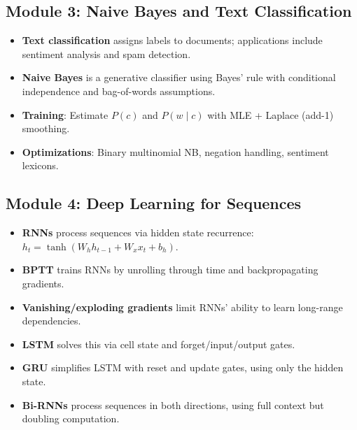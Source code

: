\documentclass[11pt,a4paper]{article}
\begin{document}
\subsection{Module 3: Naive Bayes and Text Classification}
\begin{itemize}
    \item \textbf{Text classification} assigns labels to documents; applications include sentiment analysis and spam detection.
    \item \textbf{Naive Bayes} is a generative classifier using Bayes' rule with conditional independence and bag-of-words assumptions.
    \item \textbf{Training}: Estimate $P(c)$ and $P(w \mid c)$ with MLE + Laplace (add-1) smoothing.
    \item \textbf{Optimizations}: Binary multinomial NB, negation handling, sentiment lexicons.
\end{itemize}

\subsection{Module 4: Deep Learning for Sequences}
\begin{itemize}
    \item \textbf{RNNs} process sequences via hidden state recurrence: $h_t = \tanh(W_h h_{t-1} + W_x x_t + b_h)$.
    \item \textbf{BPTT} trains RNNs by unrolling through time and backpropagating gradients.
    \item \textbf{Vanishing/exploding gradients} limit RNNs' ability to learn long-range dependencies.
    \item \textbf{LSTM} solves this via cell state and forget/input/output gates.
    \item \textbf{GRU} simplifies LSTM with reset and update gates, using only the hidden state.
    \item \textbf{Bi-RNNs} process sequences in both directions, using full context but doubling computation.
\end{itemize}
\end{document}
